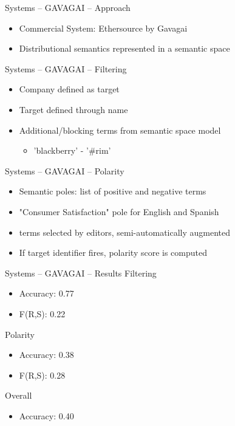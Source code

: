 \documentclass[12pt,a4paper]{beamer}
\begin{document}
\begin{frame}{Systems -- GAVAGAI -- Approach}
\begin{itemize}
\item Commercial System: Ethersource by Gavagai \cite{gavagai}
\item Distributional semantics represented in a semantic space
\end{itemize}

\end{frame}


\begin{frame}{Systems -- GAVAGAI -- Filtering}
\begin{itemize}
\item Company defined as target
\item Target defined through name
\item Additional/blocking terms from semantic space model
  \begin{itemize}
  \item 'blackberry' - '\#rim'
  \end{itemize}
\end{itemize}

\end{frame}

\begin{frame}{Systems -- GAVAGAI -- Polarity}
\begin{itemize}
\item Semantic poles: list of positive and negative terms
\item "Consumer Satisfaction" pole for English and Spanish
\item terms selected by editors, semi-automatically augmented
\item If target identifier fires, polarity score is computed
\end{itemize}

\end{frame}

\begin{frame}{Systems -- GAVAGAI -- Results}
Filtering
\begin{itemize}
\item Accuracy: 0.77
\item F(R,S): 0.22
\end{itemize}
Polarity
\begin{itemize}
\item Accuracy: 0.38
\item F(R,S): 0.28
\end{itemize}
Overall
\begin{itemize}
\item Accuracy: 0.40
\end{itemize}

\end{frame}
\end{document}
